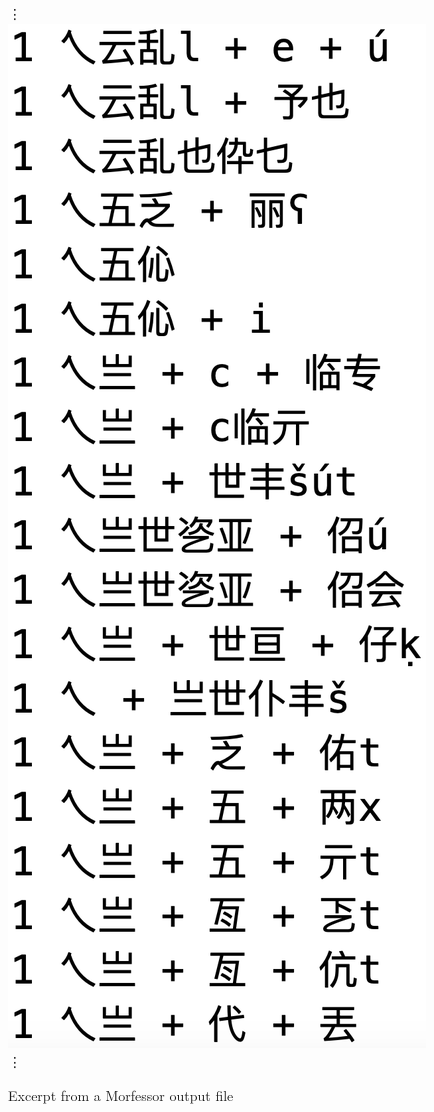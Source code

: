 \begin{figure}[t]
\begin{mdframed}
\vdots \vspace{6pt}
\includegraphics[scale=0.3]{output-from-morfessor-0} \\
\vdots
\label{fig:morfessor-output}
\caption{Excerpt from a Morfessor output file}
\end{mdframed}
\end{figure}

